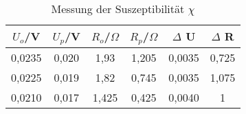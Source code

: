 \begin{table}[h!]
  \centering
  \caption{Messung der Suszeptibilität $\chi$}
  \label{tab:nd}
  \begin{tabular}{c c c c c c}
    \toprule
      $U_{o}$/V & $U_{p}$/V & $R_{o}$/$\Omega$  & $R_{p}$/$\Omega$ & $\Delta$ U & $\Delta$ R \\
    \midrule
    0,0235  & 0,020 & 1,93  & 1,205 &  0,0035 &  0,725 \\
    0,0225  & 0,019 & 1,82  & 0,745 &  0,0035 &  1,075 \\
    0,0210  & 0,017 & 1,425 & 0,425 &  0,0040 &  1 \\

    \bottomrule
  \end{tabular}
\end{table}
